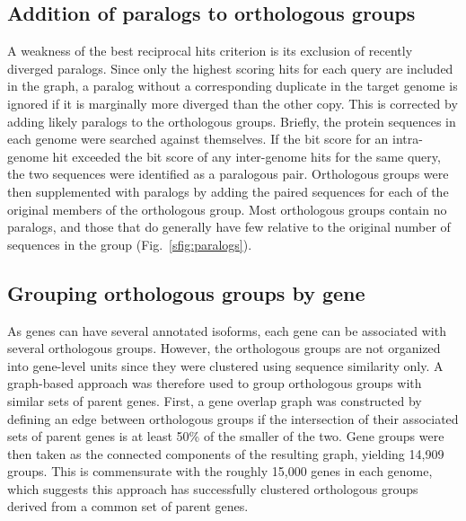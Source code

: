 \subsection{Addition of paralogs to orthologous groups}
A weakness of the best reciprocal hits criterion is its exclusion of recently diverged paralogs. Since only the highest scoring hits for each query are included in the graph, a paralog without a corresponding duplicate in the target genome is ignored if it is marginally more diverged than the other copy. This is corrected by adding likely paralogs to the orthologous groups. Briefly, the protein sequences in each genome were searched against themselves. If the bit score for an intra-genome hit exceeded the bit score of any inter-genome hits for the same query, the two sequences were identified as a paralogous pair. Orthologous groups were then supplemented with paralogs by adding the paired sequences for each of the original members of the orthologous group. Most orthologous groups contain no paralogs, and those that do generally have few relative to the original number of sequences in the group (Fig.~\ref{sfig:paralogs}).

\subsection{Grouping orthologous groups by gene}
As genes can have several annotated isoforms, each gene can be associated with several orthologous groups. However, the orthologous groups are not organized into gene-level units since they were clustered using sequence similarity only. A graph-based approach was therefore used to group orthologous groups with similar sets of parent genes. First, a gene overlap graph was constructed by defining an edge between orthologous groups if the intersection of their associated sets of parent genes is at least 50\% of the smaller of the two. Gene groups were then taken as the connected components of the resulting graph, yielding 14,909 groups. This is commensurate with the roughly 15,000 genes in each genome, which suggests this approach has successfully clustered orthologous groups derived from a common set of parent genes.

